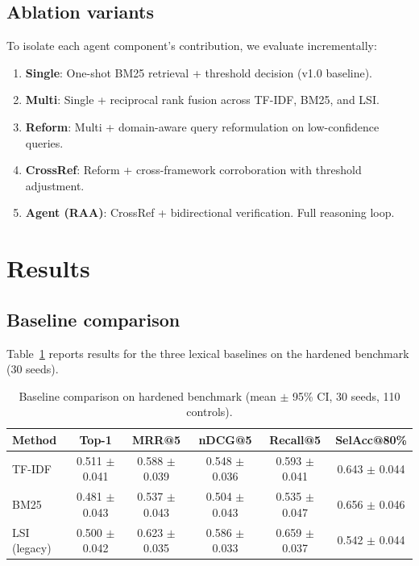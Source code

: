 \documentclass{sn-jnl}
\begin{document}
\subsection{Ablation variants}
To isolate each agent component's contribution, we evaluate incrementally:
\begin{enumerate}
\item \textbf{Single}: One-shot BM25 retrieval + threshold decision (v1.0 baseline).
\item \textbf{Multi}: Single + reciprocal rank fusion across TF-IDF, BM25, and LSI.
\item \textbf{Reform}: Multi + domain-aware query reformulation on low-confidence queries.
\item \textbf{CrossRef}: Reform + cross-framework corroboration with threshold adjustment.
\item \textbf{Agent (RAA)}: CrossRef + bidirectional verification. Full reasoning loop.
\end{enumerate}

\section{Results}

\subsection{Baseline comparison}
Table~\ref{tab:baselines} reports results for the three lexical baselines on the hardened benchmark (30 seeds).

\begin{table}[h]
\caption{Baseline comparison on hardened benchmark (mean $\pm$ 95\% CI, 30 seeds, 110 controls).}
\label{tab:baselines}
\centering
\begin{tabular}{lccccc}
\hline
Method & Top-1 & MRR@5 & nDCG@5 & Recall@5 & SelAcc@80\% \\
\hline
TF-IDF   & 0.511 $\pm$ 0.041 & 0.588 $\pm$ 0.039 & 0.548 $\pm$ 0.036 & 0.593 $\pm$ 0.041 & 0.643 $\pm$ 0.044 \\
BM25     & 0.481 $\pm$ 0.043 & 0.537 $\pm$ 0.043 & 0.504 $\pm$ 0.043 & 0.535 $\pm$ 0.047 & 0.656 $\pm$ 0.046 \\
LSI (legacy) & 0.500 $\pm$ 0.042 & 0.623 $\pm$ 0.035 & 0.586 $\pm$ 0.033 & 0.659 $\pm$ 0.037 & 0.542 $\pm$ 0.044 \\
\hline
\end{tabular}
\end{table}
\end{document}
